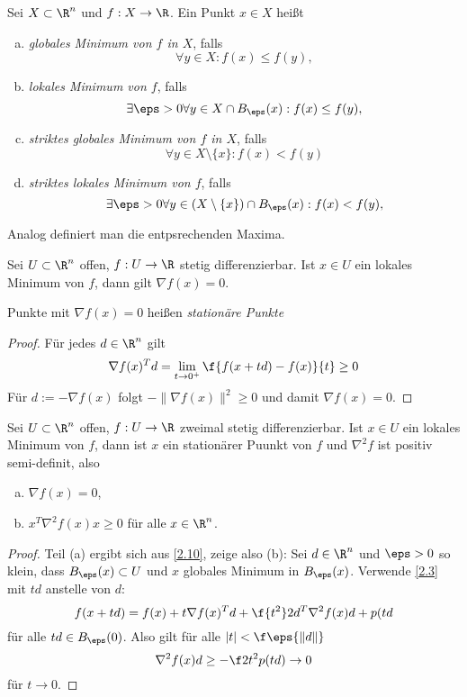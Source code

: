 \documentclass{mycourse}
\begin{document}
\begin{df} \label{2.9}
	Sei $X \subset \R^n$ und $f: X \to \R$.
	Ein Punkt $x \in X$ heißt
	\begin{enumerate}[(a)]
		\item
			\emph{globales Minimum von $f$ in $X$}, falls
			\[
				\forall y \in X: f(x) \le f(y),
			\]
		\item
			\emph{lokales Minimum von $f$}, falls
			\[
				\exists \eps > 0 \forall y \in X \cap B_\eps(x): f(x) \le f(y),
			\]
		\item
			\emph{striktes globales Minimum von $f$ in $X$}, falls
			\[
				\forall y \in X \setminus \{x\}: f(x) < f(y)
			\]
		\item
			\emph{striktes lokales Minimum von $f$}, falls
			\[
				\exists \eps > 0 \forall y \in (X \setminus \{x\}) \cap B_\eps(x): f(x) < f(y),
			\]
	\end{enumerate}
	Analog definiert man die entpsrechenden Maxima.
\end{df}

\begin{st} \label{2.10}
	Sei $U \subset \R^n$ offen, $f: U \to \R$ stetig differenzierbar.
	Ist $x \in U$ ein lokales Minimum von $f$, dann gilt $\nabla f(x) = 0$.

	Punkte mit $\nabla f(x) = 0$ heißen \emph{stationäre Punkte}
	\begin{proof}
		Für jedes $d \in \R^n$ gilt
		\[
			\nabla f(x)^T d
			= \lim_{t \to 0^+} \f {f(x+td) - f(x)}{t}
			\ge 0
		\]
		Für $d := - \nabla f(x)$ folgt $-\|\nabla f(x)\|^2 \ge 0$ und damit $\nabla f(x) = 0$.
	\end{proof}
\end{st}

\begin{st} \label{2.11}
	Sei $U \subset \R^n$ offen, $f: U \to \R$ zweimal stetig differenzierbar.
	Ist $x \in U$ ein lokales Minimum von $f$, dann ist $x$ ein stationärer Puunkt von $f$ und $\nabla^2 f$ ist positiv semi-definit, also
	\begin{enumerate}[(a)]
		\item
			$\nabla f(x) = 0$,
		\item
			$x^T \nabla^2 f(x) x \ge 0$ für alle $x \in \R^n$.
	\end{enumerate}
	\begin{proof}
		Teil (a) ergibt sich aus \ref{2.10}, zeige also (b):
		Sei $d \in \R^n$ und $\eps > 0$ so klein, dass $B_\eps(x) \subset U$ und $x$ globales Minimum in $B_\eps(x)$.
		Verwende \ref{2.3} mit $td$ anstelle von $d$:
		\[
			f(x+td)
			= f(x) + t \nabla f(x)^T d + \f {t^2}2 d^T \nabla^2 f(x) d + p(td
		\]
		für alle $td \in B_\eps(0)$.
		Also gilt für alle $|t| < \f \eps{\|d\|}$
		\[
			\nabla^2 f(x) d
			\ge - \f 2{t^2} p(td)
			\to 0
		\]
		für $t \to 0$.
	\end{proof}
\end{st}
\end{document}
